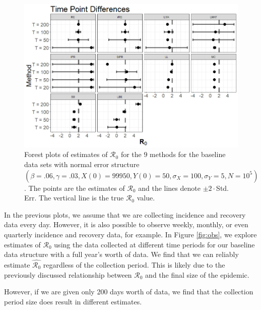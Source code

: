 \documentclass[12pt]{article}
\newcommand{\xxsir}{\ensuremath{9} } %
\newcommand{\rr}{\ensuremath{\mathcal{R}_0}}
\begin{document}
\begin{figure}[H]
	\centering
	\includegraphics[scale=0.5]{images/timediff.jpg}
	\caption{Forest plots of estimates of $\rr$ for the \xxsir methods for the baseline data sets with normal error structure $(\beta=.06, \gamma=.03, X(0) = 99950, Y(0)=50, \sigma_X=100, \sigma_Y=5, N=10^5)$.  The points are the estimates of $\rr$ and the lines denote $\pm 2\cdot $Std. Err.  The vertical line is the true $\rr$ value.}\label{fig:timediff}
      \end{figure}

      In the previous plots, we assume that we are collecting incidence and recovery data every day.  However, it is also possible to observe weekly, monthly, or even quarterly incidence and recovery data, for example.  In Figure \ref{fig:obs}, we explore estimates of $\rr$ using the data collected at different time periods for our baseline data structure with a full year's worth of data.  We find that we can reliably estimate $\hat{\rr}$ regardless of the collection period.  This is likely due to the previously discussed relationship between $\rr$ and the final size of the epidemic. 

However, if we are given only 200 days worth of data, we find that the collection period size does result in different estimates.    
      
\end{document}
